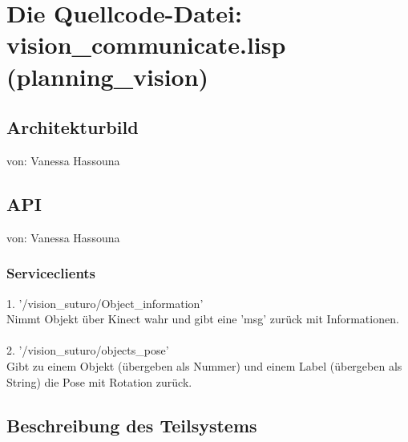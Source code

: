 \documentclass{suturo}
\makeatletter
\newcommand{\chapterauthor}[1]{%
  {\parindent0pt\vspace*{-27pt}%
  \linespread{0}\small\begin{flushright}von: #1\end{flushright}%
  \par\nobreak\vspace*{0pt}}
  \@afterheading%
}
\makeatother
\begin{document}
\newpage
\section{Die Quellcode-Datei: vision\_communicate.lisp (planning\_vision)}

\subsection{Architekturbild}

\chapterauthor{Vanessa Hassouna}



\begin{figure}[!htb]
\end{figure}




\subsection{API}
\chapterauthor{Vanessa Hassouna}
\subsubsection{Serviceclients}
1. '/vision\_suturo/Object\_information' \\
Nimmt Objekt über Kinect wahr und gibt eine 'msg' zurück mit Informationen.\\ \\
2. '/vision\_suturo/objects\_pose' \\
Gibt zu einem Objekt (übergeben als Nummer) und einem Label (übergeben als String) die Pose mit Rotation zurück.

\subsection{Beschreibung des Teilsystems}
\end{document}
